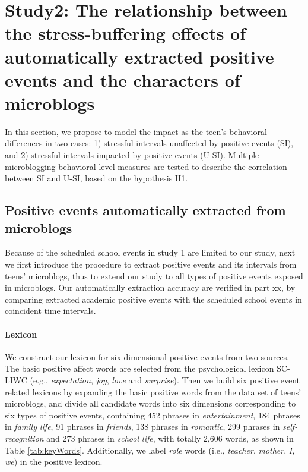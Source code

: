 
\section{Study2: The relationship between the stress-buffering effects of automatically extracted positive events and the characters of microblogs}
In this section,
we propose to model the impact as the teen's behavioral differences in two cases:
1) stressful intervals unaffected by positive events (SI),
and 2) stressful intervals impacted by positive events (U-SI).
Multiple microblogging behavioral-level measures are tested to describe the correlation between SI and U-SI,
based on the hypothesis H1.


\subsection{Positive events automatically extracted from microblogs}
Because of the scheduled school events in study 1 are limited to our study,
next we first introduce the procedure to extract positive events and its intervals from teens' microblogs,
thus to extend our study to all types of positive events exposed in microblogs.
Our automatically extraction accuracy are verified in part xx, by comparing extracted academic positive events with the scheduled school events in coincident time intervals.

\paragraph{Lexicon}
We construct our lexicon for six-dimensional positive events from two sources.
The basic positive affect words are selected from the psychological lexicon SC-LIWC (e.g., \emph{expectation}, \emph{joy}, \emph{love} and \emph{surprise})\cite{Tausczik2010The}.
Then we build six positive event related lexicons by expanding the basic positive words from the data set of teens' microblogs,
and divide all candidate words into six dimensions corresponding to six types of positive events,
containing 452 phrases in \emph{entertainment},
184 phrases in \emph{family life},
91 phrases in \emph{friends},
138 phrases in \emph{romantic},
299 phrases in \emph{self-recognition} and 273 phrases in \emph{school life}, with totally 2,606 words,
as shown in Table \ref{tab:keyWords}.
Additionally, we label \emph{role} words (i.e., \emph{teacher}, \emph{mother}, \emph{I, we}) in the positive lexicon.

